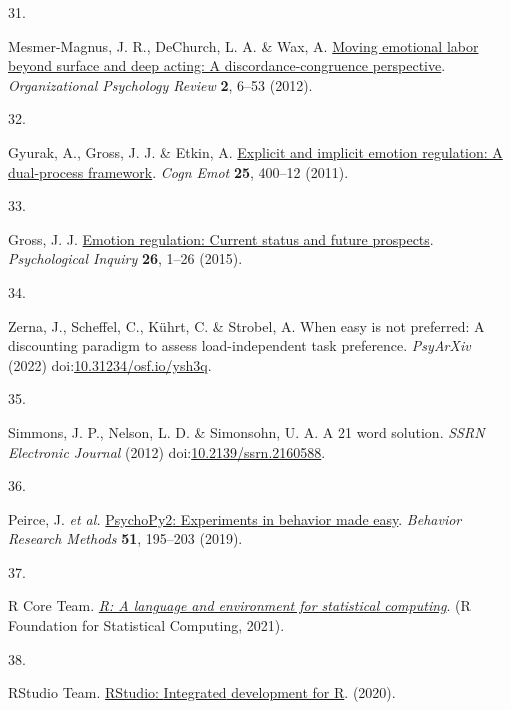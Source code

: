 \documentclass[
  man,floatsintext]{apa6}
\newlength{\cslhangindent}
\newlength{\csllabelwidth}
\newlength{\cslentryspacingunit} %
\newenvironment{CSLReferences}[2] %
 {%
  \setlength{\parindent}{0pt}
  \ifodd #1
  \let\oldpar\par
  \def\par{\hangindent=\cslhangindent\oldpar}
  \fi
  \setlength{\parskip}{#2\cslentryspacingunit}
 }%
 {}
\newcommand{\CSLLeftMargin}[1]{\parbox[t]{\csllabelwidth}{#1}}
\newcommand{\CSLRightInline}[1]{\parbox[t]{\linewidth - \csllabelwidth}{#1}\break}
\begin{document}
\begin{CSLReferences}{0}{0}
\leavevmode{}%
\CSLLeftMargin{31. }%
\CSLRightInline{Mesmer-Magnus, J. R., DeChurch, L. A. \& Wax, A. \href{https://doi.org/10.1177/2041386611417746}{Moving emotional labor beyond surface and deep acting: A discordance-congruence perspective}. \emph{Organizational Psychology Review} \textbf{2}, 6--53 (2012).}

\leavevmode{}%
\CSLLeftMargin{32. }%
\CSLRightInline{Gyurak, A., Gross, J. J. \& Etkin, A. \href{https://doi.org/10.1080/02699931.2010.544160}{Explicit and implicit emotion regulation: A dual-process framework}. \emph{Cogn Emot} \textbf{25}, 400--12 (2011).}

\leavevmode{}%
\CSLLeftMargin{33. }%
\CSLRightInline{Gross, J. J. \href{https://doi.org/10.1080/1047840x.2014.940781}{Emotion regulation: Current status and future prospects}. \emph{Psychological Inquiry} \textbf{26}, 1--26 (2015).}

\leavevmode{}%
\CSLLeftMargin{34. }%
\CSLRightInline{Zerna, J., Scheffel, C., Kührt, C. \& Strobel, A. When easy is not preferred: A discounting paradigm to assess load-independent task preference. \emph{PsyArXiv} (2022) doi:\href{https://doi.org/10.31234/osf.io/ysh3q}{10.31234/osf.io/ysh3q}.}

\leavevmode{}%
\CSLLeftMargin{35. }%
\CSLRightInline{Simmons, J. P., Nelson, L. D. \& Simonsohn, U. A. A 21 word solution. \emph{SSRN Electronic Journal} (2012) doi:\href{https://doi.org/10.2139/ssrn.2160588}{10.2139/ssrn.2160588}.}

\leavevmode{}%
\CSLLeftMargin{36. }%
\CSLRightInline{Peirce, J. \emph{et al.} \href{https://doi.org/10.3758/s13428-018-01193-y}{{PsychoPy2}: {Experiments} in behavior made easy}. \emph{Behavior Research Methods} \textbf{51}, 195--203 (2019).}

\leavevmode{}%
\CSLLeftMargin{37. }%
\CSLRightInline{R Core Team. \emph{\href{https://www.R-project.org/}{R: A language and environment for statistical computing}}. (R Foundation for Statistical Computing, 2021).}

\leavevmode{}%
\CSLLeftMargin{38. }%
\CSLRightInline{RStudio Team. \href{http://www.rstudio.com}{{RStudio}: {Integrated} development for {R}}. (2020).}


\end{CSLReferences}
\end{document}
